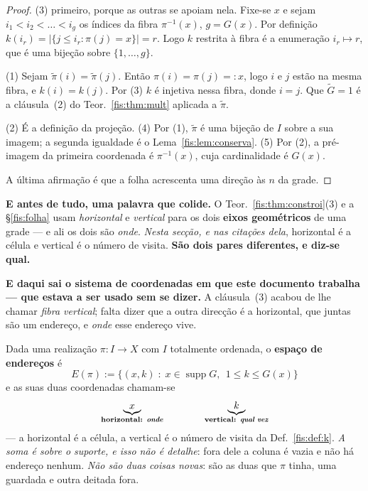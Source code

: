 \documentclass[livro.tex]{subfiles}
\begin{document}
\begin{proof}
(3) primeiro, porque as outras se apoiam nela. Fixe-se $x$ e sejam
$i_1<i_2<\dots<i_g$ os índices da fibra $\pi^{-1}(x)$, $g=G(x)$. Por definição
$k(i_r)=\lvert\{j\le i_r:\pi(j)=x\}\rvert=r$. Logo $k$ restrita à fibra é a
enumeração $i_r\mapsto r$, que é uma bijeção sobre $\{1,\dots,g\}$.

(1) Sejam $\tilde\pi(i)=\tilde\pi(j)$. Então $\pi(i)=\pi(j)=:x$, logo $i$ e $j$
estão na mesma fibra, e $k(i)=k(j)$. Por (3) $k$ é injetiva nessa fibra, donde
$i=j$. Que $\tilde G=1$ é a cláusula~(2) do Teor.~\ref{fis:thm:mult}
aplicada a $\tilde\pi$.

(2) É a definição da projeção. (4) Por (1), $\tilde\pi$ é uma bijeção de $I$ sobre
a sua imagem; a segunda igualdade é o Lema~\ref{fis:lem:conserva}. (5) Por (2), a
pré-imagem da primeira coordenada é $\pi^{-1}(x)$, cuja cardinalidade é $G(x)$.

A última afirmação é que a folha acrescenta uma direção às $n$ da grade.
\end{proof}

\medskip\noindent\textbf{E antes de tudo, uma palavra que colide.} O
Teor.~\ref{fis:thm:constroi}(3) e a §\ref{fis:folha} usam \emph{horizontal} e
\emph{vertical} para os dois \textbf{eixos geométricos} de uma grade --- e ali
os dois são \emph{onde}. \emph{Nesta secção, e nas citações dela}, horizontal é
a célula e vertical é o número de visita. \textbf{São dois pares diferentes, e
diz-se qual.}

\medskip\noindent\textbf{E daqui sai o sistema de coordenadas em que este
documento trabalha --- que estava a ser usado sem se dizer.} A cláusula~(3)
acabou de lhe chamar \emph{fibra vertical}; falta dizer que a outra direcção é a
horizontal, que juntas são um endereço, e \emph{onde} esse endereço vive.

\begin{definicao}\label{fis:def:coord2}
Dada uma realização $\pi\colon I\to X$ com $I$ totalmente ordenada, o
\textbf{espaço de endereços} é
\[
\boxed{\;E(\pi):=\bigl\{(x,k)\;:\;x\in\operatorname{supp}G,\ \ 1\le k\le G(x)\bigr\}\;}
\]
e as suas duas coordenadas chamam-se
\[
\underbrace{x}_{\textbf{horizontal: \emph{onde}}}
\qquad\qquad
\underbrace{k}_{\textbf{vertical: \emph{qual vez}}}
\]
--- a horizontal é a célula, a vertical é o número de visita da
Def.~\ref{fis:def:k}. \emph{A soma é sobre o suporte, e isso não é detalhe}: fora
dele a coluna é vazia e não há endereço nenhum. \emph{Não são duas coisas novas}:
são as duas que $\pi$ tinha, uma guardada e outra deitada fora.
\end{definicao}
\end{document}
